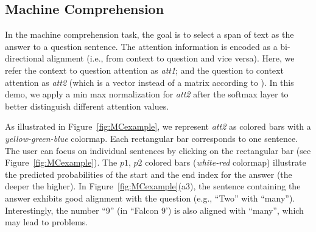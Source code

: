 \subsection{Machine Comprehension}
\label{sec:MCexample}
In the machine comprehension task, the goal is to select a span of text as the answer
to a question sentence.
The attention information is encoded as a bi-directional alignment (i.e., from context to question and vice versa). 
Here, we refer the context to question attention as \emph{att1}; and the question to context attention as \emph{att2} (which is a vector instead of a matrix according to \citet{Seo2016}). In this demo, we apply a min max normalization for \emph{att2} after the softmax layer to better distinguish different attention values.

As illustrated in Figure~\ref{fig:MCexample}, we represent \emph{att2} as colored bars with a \emph{yellow-green-blue} colormap. Each rectangular bar corresponds to one sentence. The user can focus on individual sentences by clicking on the rectangular bar (see Figure~\ref{fig:MCexample}).
The $p1$, $p2$ colored bars (\emph{white-red} colormap) illustrate the predicted probabilities of the start and the end index for the answer (the deeper the higher). %
%
In Figure~\ref{fig:MCexample}(a3), the sentence containing the answer exhibits good alignment with the question (e.g., ``Two'' with ``many'').
Interestingly, the number ``9'' (in ``Falcon 9') is also aligned with ``many'', which may lead to problems.


